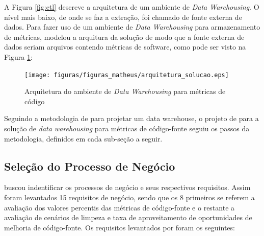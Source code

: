 A Figura \ref{fig:etl} descreve a arquitetura de um ambiente de \textit{Data Warehousing}. O nível mais baixo, de onde se faz a extração, foi chamado de fonte externa de dados. Para fazer uso de um ambiente de \textit{Data Warehousing} para armazenamento de métricas,  modelou a arquitura da solução de modo que a fonte externa de dados seriam arquivos contendo métricas de software, como pode ser visto na Figura \ref{fig:arquitetura_solucao}:

\begin{figure}[h!]
\centering
\texttt{[image: figuras/figuras\_matheus/arquitetura\_solucao.eps]}
\caption{Arquitetura do ambiente de \textit{Data Warehousing} para métricas de código}
\label{fig:arquitetura_solucao}
\end{figure}
\FloatBarrier

Seguindo a metodologia de  para projetar um data warehouse,  o projeto de  para a solução de \textit{data warehousing} para métricas de código-fonte seguiu os passos da metodologia, definidos em cada sub-seção a seguir.

\subsection{Seleção do Processo de Negócio}

 buscou indentificar os processos de negócio e seus respectivos requisitos. Assim foram levantados 15 requisitos de negócio, sendo que os 8 primeiros se referem a avaliação dos valores percentis das métricas de código-fonte e o restante a avaliação de cenários de limpeza e taxa de aproveitamento de oportunidades de melhoria de código-fonte. Os requisitos levantados por  foram os seguintes:

